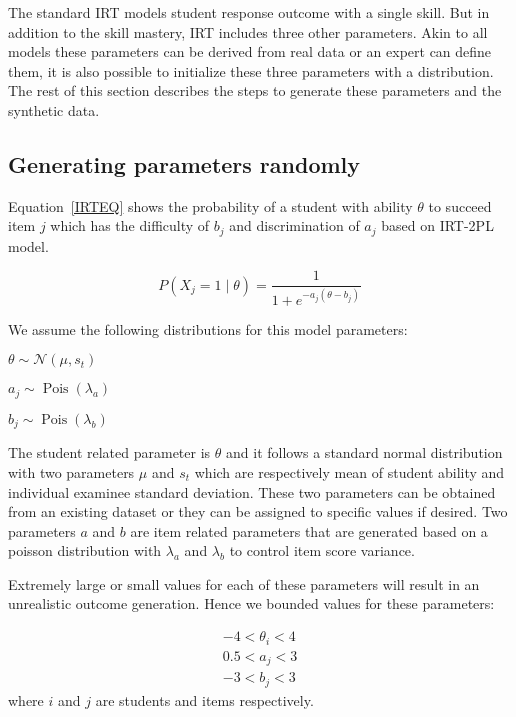 The standard IRT models student response outcome with a single skill. But in addition to the skill mastery, IRT includes three other parameters. Akin to all models these parameters can be derived from real data or an expert can define them, it is also possible to initialize these three parameters with a distribution. The rest of this section describes the steps to generate these parameters and the synthetic data.

\subsection{Generating parameters randomly}
Equation~\ref{IRTEQ} shows the probability of a student with ability $\theta$ to succeed item $j$ which has the difficulty of $b_j$ and discrimination of $a_j$ based on IRT-2PL model. 

\newcommand\pN{\mathcal{N}}

\begin{equation}
P(X_j\!=\!1\;|\;\theta) = \frac{1}{1+e^{-a_j(\theta-b_j)}}
\label{IRTEQ}
\end{equation}

We assume the following distributions for this model parameters:

\begin{center}
$\theta \sim \pN(\mu, s_t)$

$a_j \sim \operatorname{Pois} \left({\lambda_a}\right)$

$b_j \sim \operatorname{Pois} \left({\lambda_b}\right)$
\end{center}


The student related parameter is $\theta$ and it follows a standard normal distribution with two parameters $\mu$ and $s_t$ which are respectively mean of student ability and individual examinee standard deviation. These two parameters can be obtained from an existing dataset or they can be assigned to specific values if desired. Two parameters $a$ and $b$ are item related parameters that are generated based on a poisson distribution with $\lambda_a$ and $\lambda_b$ to control item score variance.

Extremely large or small values for each of these parameters will result in an unrealistic outcome generation. Hence we bounded values for these parameters:

\begin{eqnarray*}
-4 < \theta_i < 4\\
0.5 < a_j < 3\\
-3 < b_j < 3
\end{eqnarray*}
where $i$ and $j$ are students and items respectively.

